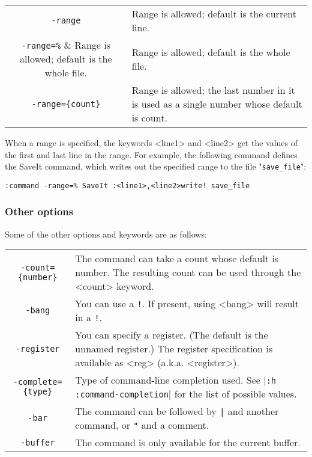 {\begin{center} \begin{tabular}{c l}
				\verb;-range; & Range is allowed; default is the current line. \\
				\verb;-range=%; & Range is allowed; default is the whole file. \\
				\verb;-range={count}; & Range is allowed; the last number in it is used as a single number whose default is {count}. \\
\end{tabular} \end{center}

When a range is specified, the keywords <line1> and <line2> get the values of the first and last line in the range.
For example, the following command defines the SaveIt command, which writes out the specified range to the file "\verb!save_file!":

\begin{Verbatim}[samepage=true]
 :command -range=% SaveIt :<line1>,<line2>write! save_file
\end{Verbatim}
\subsubsection{Other options}
Some of the other options and keywords are as follows:

\begin{center} \begin{tabular}{c l}
				\verb;-count={number}; & The command can take a count whose default is {number}.
				The resulting count can be used through the <count> keyword. \\
				\verb;-bang; & You can use a \verb:!:.
				If present, using <bang> will result in a \verb:!:. \\
				\verb;-register; & You can specify a register.
				(The default is the unnamed register.)
				The register specification is available as <reg> (a.k.a. <register>). \\
				\verb;-complete={type}; & Type of command-line completion used.  See |\verb!:h :command-completion!| for the list of possible values. \\
				\verb;-bar; & The command can be followed by \verb!|! and another command, or \verb!"! and a comment. \\
				\verb;-buffer; & The command is only available for the current buffer. \\
\end{tabular} \end{center}

}
